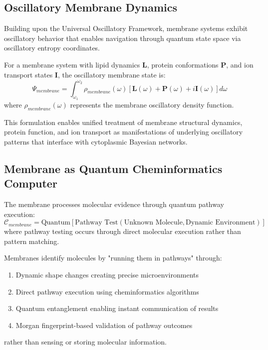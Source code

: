 \documentclass[11pt,a4paper]{article}
\begin{document}
\subsection{Oscillatory Membrane Dynamics}

Building upon the Universal Oscillatory Framework, membrane systems exhibit oscillatory behavior that enables navigation through quantum state space via oscillatory entropy coordinates.

\begin{definition}
For a membrane system with lipid dynamics $\mathbf{L}$, protein conformations $\mathbf{P}$, and ion transport states $\mathbf{I}$, the oscillatory membrane state is:
\begin{equation}
\Psi_{membrane} = \int_{\omega_1}^{\omega_2} \rho_{membrane}(\omega) [\mathbf{L}(\omega) + \mathbf{P}(\omega) + i\mathbf{I}(\omega)] d\omega
\end{equation}
where $\rho_{membrane}(\omega)$ represents the membrane oscillatory density function.
\end{definition}

This formulation enables unified treatment of membrane structural dynamics, protein function, and ion transport as manifestations of underlying oscillatory patterns that interface with cytoplasmic Bayesian networks.

\subsection{Membrane as Quantum Cheminformatics Computer}

\begin{definition}
The membrane processes molecular evidence through quantum pathway execution:
\begin{equation}
\mathcal{C}_{membrane} = \text{Quantum}\left[\text{Pathway Test}(\text{Unknown Molecule}, \text{Dynamic Environment})\right]
\end{equation}
where pathway testing occurs through direct molecular execution rather than pattern matching.
\end{definition}

\begin{theorem}
Membranes identify molecules by "running them in pathways" through:
\begin{enumerate}
\item Dynamic shape changes creating precise microenvironments
\item Direct pathway execution using cheminformatics algorithms
\item Quantum entanglement enabling instant communication of results
\item Morgan fingerprint-based validation of pathway outcomes
\end{enumerate}
rather than sensing or storing molecular information.
\end{theorem}
\end{document}

